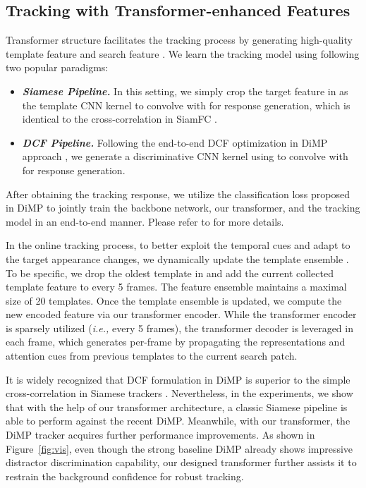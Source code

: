 \documentclass[10pt,twocolumn,letterpaper]{article}
\begin{document}
\subsection{Tracking with Transformer-enhanced Features}\label{tracking with transformer}
Transformer structure facilitates the tracking process by generating high-quality template feature  and search feature .
We learn the tracking model using  following two popular paradigms:
\begin{itemize}[noitemsep,nolistsep]	
	\item \emph{\bf Siamese Pipeline.} In this setting, we simply crop the target feature in  as the template CNN kernel to convolve with  for response generation, which is identical to the cross-correlation in SiamFC \cite{SiamFC}.
	
	\item \emph{\bf DCF Pipeline.} Following the end-to-end DCF optimization in DiMP approach \cite{DiMP}, we generate a discriminative CNN kernel using   to convolve with  for response generation. 
\end{itemize}
After obtaining the tracking response, we utilize the classification loss proposed in DiMP \cite{DiMP} to jointly train the backbone network, our transformer, and the tracking model in an end-to-end manner. 
Please refer to \cite{DiMP} for more details.



In the online tracking process, to better exploit the temporal cues and adapt to the target appearance changes, we dynamically update the template ensemble .
To be specific, we drop the oldest template in  and add the current collected template feature to  every 5 frames.
The feature ensemble maintains a maximal size of 20 templates.
Once the template ensemble  is updated, we compute the new encoded feature  via our transformer encoder.
While the transformer encoder is sparsely utilized (\emph{i.e.,} every 5 frames), the transformer decoder is leveraged in each frame, which generates per-frame  by propagating the representations and attention cues from previous templates to the current search patch.





It is widely recognized that DCF formulation in DiMP \cite{DiMP} is superior to the simple cross-correlation in Siamese trackers \cite{SiamFC,siamrpn++}.
Nevertheless, in the experiments, we show that with the help of our transformer architecture, a classic Siamese pipeline is able to perform against the recent DiMP.
Meanwhile, with our transformer, the DiMP tracker acquires further performance improvements.
As shown in Figure~\ref{fig:vis}, even though the strong baseline DiMP \cite{DiMP} already shows impressive distractor discrimination capability, our designed transformer further assists it to restrain the background confidence for robust tracking.
\end{document}
